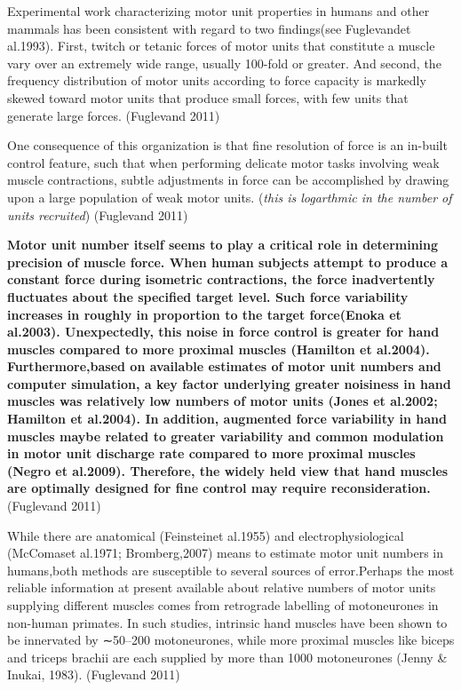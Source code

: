 {            Experimental work characterizing motor unit properties in
            humans and other mammals has been consistent with regard to
            two findings(see Fuglevandet al.1993). First, twitch or
            tetanic forces of motor units that constitute a muscle vary
            over an extremely wide range, usually 100-fold or greater.
            And second, the frequency distribution of motor units
            according to force capacity is markedly skewed toward motor
            units that produce small forces, with few units that
            generate large forces. (Fuglevand 2011)

            One consequence of this organization is that fine resolution
            of force is an in-built control feature, such that when
            performing delicate motor tasks involving weak muscle
            contractions, subtle adjustments in force can be
            accomplished by drawing upon a large population of weak
            motor units. (\emph{this is logarthmic in the number of
            units recruited}) (Fuglevand 2011)

            \textbf{Motor unit number itself seems to play a critical
            role in determining precision of muscle force. When human
            subjects attempt to produce a constant force during
            isometric contractions, the force inadvertently fluctuates
            about the specified target level. Such force variability
            increases in roughly in proportion to the target force(Enoka
            et al.2003). Unexpectedly, this noise in force control is
            greater for hand muscles compared to more proximal muscles
            (Hamilton et al.2004). Furthermore,based on available
            estimates of motor unit numbers and computer simulation, a
            key factor underlying greater noisiness in hand muscles was
            relatively low numbers of motor units (Jones et al.2002;
            Hamilton et al.2004). In addition, augmented force
            variability in hand muscles maybe related to greater
            variability and common modulation in motor unit discharge
            rate compared to more proximal muscles (Negro et al.2009).
            Therefore, the widely held view that hand muscles are
            optimally designed for fine control may require
            reconsideration.} (Fuglevand 2011)

            While there are anatomical (Feinsteinet al.1955) and
            electrophysiological (McComaset al.1971; Bromberg,2007)
            means to estimate motor unit numbers in humans,both methods
            are susceptible to several sources of error.Perhaps the most
            reliable information at present available about relative
            numbers of motor units supplying different muscles comes
            from retrograde labelling of motoneurones in non-human
            primates. In such studies, intrinsic hand muscles have been
            shown to be innervated by ∼50--200 motoneurones, while more
            proximal muscles like biceps and triceps brachii are each
            supplied by more than 1000 motoneurones (Jenny \& Inukai,
            1983). (Fuglevand 2011)

}
